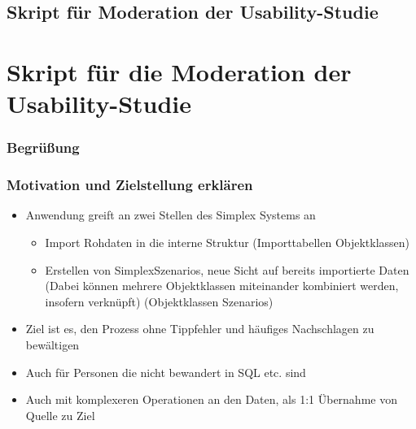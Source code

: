 \ifdefined\STANDALONE
  \section*{Skript für Moderation der Usability-Studie}
\else
  \chapter{Skript für die Moderation der Usability-Studie}
  \label{app:moderation}
\fi

\subsection*{Begrüßung}
\subsection*{Motivation und Zielstellung erklären}
\begin{itemize}
  \item Anwendung greift an zwei Stellen des Simplex Systems an
        \begin{itemize}
          \item Import \textrightarrow{} Rohdaten in die interne Struktur (Importtabellen \textrightarrow{} Objektklassen)
          \item Erstellen von SimplexSzenarios, neue Sicht auf bereits importierte Daten (Dabei können mehrere Objektklassen miteinander kombiniert werden, insofern verknüpft) (Objektklassen \textrightarrow{} Szenarios)
        \end{itemize}
  \item Ziel ist es, den Prozess ohne Tippfehler und häufiges Nachschlagen zu bewältigen
  \item Auch für Personen die nicht bewandert in SQL etc. sind
  \item Auch mit komplexeren Operationen an den Daten, als 1:1 Übernahme von Quelle zu Ziel
\end{itemize}

